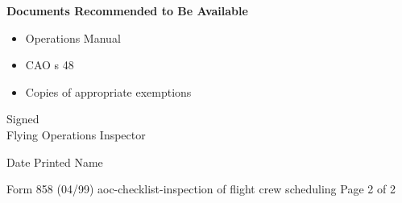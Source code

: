 \documentclass[11pt]{article}
\begin{document}
\noindent
\textbf{Documents Recommended to Be Available}

\begin{itemize}[noitemsep] %
  \item Operations Manual \hfill {}  \\
  \item CAO s 48 \hfill {}
   \\
  \item Copies of appropriate exemptions \hfill {}  \\
\end{itemize}

\vspace{2em}
\noindent
Signed \hrulefill \\
\noindent
Flying Operations Inspector

\vspace{1em}
\noindent
Date \hrulefill \hfill Printed Name \hrulefill

\vfill %
\noindent
Form 858 (04/99) \hfill aoc-checklist-inspection of flight crew scheduling \hfill Page 2 of 2
\end{document}
